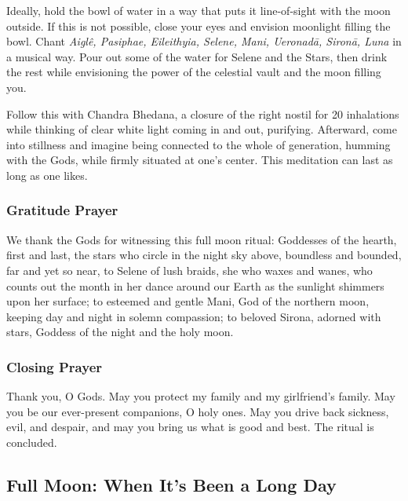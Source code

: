 \documentclass[
]{book}
\begin{document}
Ideally, hold the bowl of water in a way that puts it line-of-sight with the moon outside. If this is not possible, close your eyes and envision moonlight filling the bowl. Chant \emph{Aiglê, Pasiphae, Eileithyia, Selene, Mani, Ueronadā, Sironā, Luna} in a musical way. Pour out some of the water for Selene and the Stars, then drink the rest while envisioning the power of the celestial vault and the moon filling you.

Follow this with Chandra Bhedana, a closure of the right nostil for 20 inhalations while thinking of clear white light coming in and out, purifying. Afterward, come into stillness and imagine being connected to the whole of generation, humming with the Gods, while firmly situated at one's center. This meditation can last as long as one likes.

\hypertarget{gratitude-prayer-1}{%
\subsubsection{Gratitude Prayer}\label{gratitude-prayer-1}}

We thank the Gods for witnessing this full moon ritual:
Goddesses of the hearth, first and last,
the stars who circle in the night sky above,
boundless and bounded, far and yet so near,
to Selene of lush braids,
she who waxes and wanes,
who counts out the month in her dance
around our Earth as the sunlight shimmers upon her surface;
to esteemed and gentle Mani,
God of the northern moon,
keeping day and night in solemn compassion;
to beloved Sirona, adorned with stars,
Goddess of the night and the holy moon.

\hypertarget{closing-prayer-1}{%
\subsubsection{Closing Prayer}\label{closing-prayer-1}}

Thank you, O Gods.
May you protect my family and my girlfriend's family.
May you be our ever-present companions, O holy ones.
May you drive back sickness, evil, and despair,
and may you bring us what is good and best.
The ritual is concluded.

\hypertarget{full-moon-when-its-been-a-long-day}{%
\subsection{Full Moon: When It's Been a Long Day}\label{full-moon-when-its-been-a-long-day}}
\end{document}
